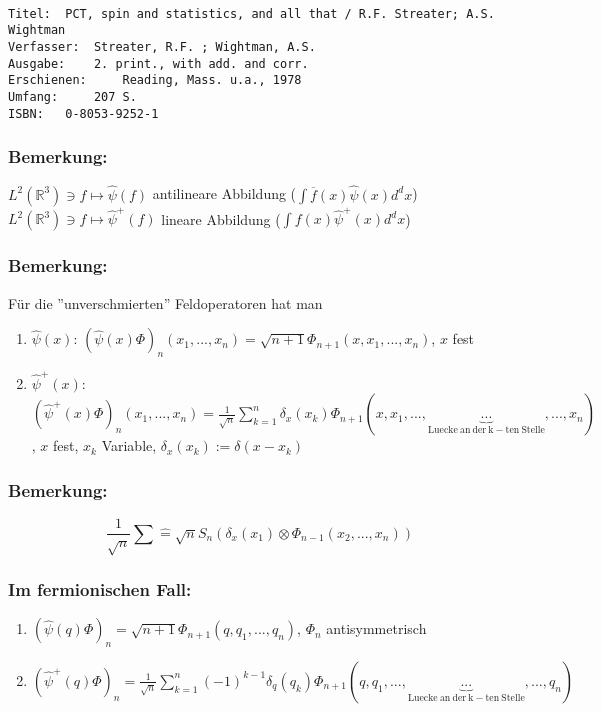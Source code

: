 \documentclass[twoside,a4paper]{scrartcl}
\newcommand{\R}{\mathbb{R}}
\renewcommand{\1}{\mathds{1}}
\renewcommand{\R}{\mathbb{R}}
\begin{document}
\begin{tiny}
\begin{verbatim}

Titel: 	PCT, spin and statistics, and all that / R.F. Streater; A.S. Wightman
Verfasser: 	Streater, R.F. ; Wightman, A.S.
Ausgabe: 	2. print., with add. and corr.
Erschienen: 	Reading, Mass. u.a., 1978
Umfang: 	207 S.
ISBN: 	0-8053-9252-1
\end{verbatim}
\end{tiny}

\subsubsection*{Bemerkung:}
$L^2(\R^3) \ni f \mapsto \hat \psi(f)$ antilineare Abbildung ($\int \overline{f}(x)\hat \psi(x)d^dx$)\\
$L^2(\R^3) \ni f \mapsto \hat \psi^+(f)$ lineare Abbildung ($\int {f}(x)\hat \psi^+(x)d^dx$)\\
\subsubsection*{Bemerkung:}
Für die ''unverschmierten'' Feldoperatoren hat man 
\begin{enumerate}
\item $\hat \psi(x)$: $(\hat \psi(x)\Phi)_n(x_1,...,x_n)=\sqrt{n+1}\Phi_{n+1}(x,x_1,...,x_n)$, $x$ fest
\item $\hat \psi^+(x)$: $(\hat \psi^+(x)\Phi)_n(x_1,...,x_n)=\frac{1}{\sqrt{n}}\sum_{k=1}^n \delta_x(x_k) \Phi_{n+1}(x,x_1,...,\underbrace{...}_{\mathrm{Luecke \ an \ der \ k-ten \ Stelle}},...,x_n)$, $x$ fest, $x_k$ Variable, $\delta_x(x_k):=\delta(x-x_k)$
\end{enumerate}
\subsubsection*{Bemerkung:}
$$\frac{1}{\sqrt{n}}\sum \mathrel{\widehat{=}} \sqrt{n} S_n(\delta_x(x_1)\otimes \Phi_{n-1}(x_2,...,x_n))$$
\subsubsection*{Im fermionischen Fall:}
\begin{enumerate}
\item $(\hat \psi(q)\Phi)_n=\sqrt{n+1}\Phi_{n+1}(q,q_1,...,q_n)$, $\Phi_n$ antisymmetrisch
\item $(\hat \psi^+(q)\Phi)_n=\frac{1}{\sqrt{n}}\sum_{k=1}^n (-1)^{k-1}\delta_q(q_k) \Phi_{n+1}(q,q_1,...,\underbrace{...}_{\mathrm{Luecke \ an \ der \ k-ten \ Stelle}},...,q_n)$
\end{enumerate}
\end{document}

